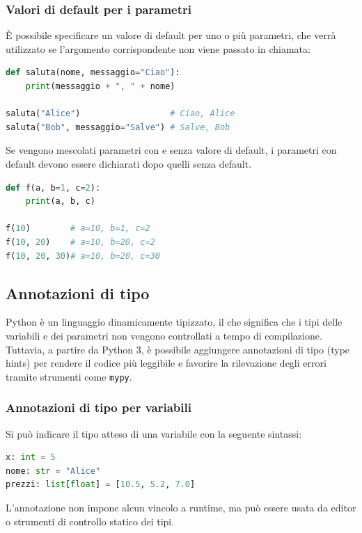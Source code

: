 \subsubsection{Valori di default per i parametri}
È possibile specificare un valore di default per uno o più parametri, che verrà utilizzato se l’argomento corrispondente non viene passato in chiamata:

\begin{lstlisting}[language = python, frame = none]
def saluta(nome, messaggio="Ciao"):
    print(messaggio + ", " + nome)

saluta("Alice")                  # Ciao, Alice
saluta("Bob", messaggio="Salve") # Salve, Bob
\end{lstlisting}

Se vengono mescolati parametri con e senza valore di default, i parametri con default devono essere dichiarati dopo quelli senza default.

\begin{lstlisting}[language = python, frame = none]
def f(a, b=1, c=2):
    print(a, b, c)

f(10)        # a=10, b=1, c=2
f(10, 20)    # a=10, b=20, c=2
f(10, 20, 30)# a=10, b=20, c=30
\end{lstlisting}

\subsection{Annotazioni di tipo}

Python è un linguaggio dinamicamente tipizzato, il che significa che i tipi delle variabili e dei parametri non vengono controllati a tempo di compilazione. Tuttavia, a partire da Python 3, è possibile aggiungere annotazioni di tipo (type hints) per rendere il codice più leggibile e favorire la rilevazione degli errori tramite strumenti come \texttt{mypy}.

\subsubsection*{Annotazioni di tipo per variabili}

Si può indicare il tipo atteso di una variabile con la seguente sintassi:
\begin{lstlisting}[language = python, frame = none]
x: int = 5
nome: str = "Alice"
prezzi: list[float] = [10.5, 5.2, 7.0]
\end{lstlisting}

L’annotazione non impone alcun vincolo a runtime, ma può essere usata da editor o strumenti di controllo statico dei tipi.

